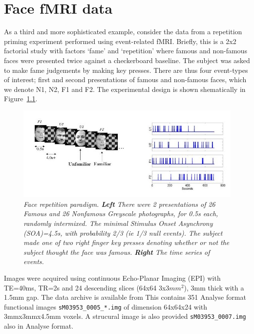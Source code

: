 \documentclass[a4paper,titlepage]{book}
\begin{document}
\chapter{Face fMRI data}

As a third and more sophisticated example, consider the data from a repetition priming experiment performed using event-related fMRI. Briefly, this is a 2x2 factorial study with factors `fame' and `repetition' where famous and non-famous faces were presented twice against a checkerboard baseline. The subject was asked to make fame judgements by making key presses. There are thus four event-types of interest; first and second presentations of famous and non-famous faces, which 
we denote N1, N2, F1 and F2. The experimental design is shown shematically in Figure~\ref{face_design}.
\begin{figure}
\begin{center}
\includegraphics[width=150mm]{face_paradigm}
\caption{\em Face repetition paradigm. {\bf Left} There were 2 presentations of 26 Famous and 26 Nonfamous Greyscale photographs, for 0.5s each, randomly intermixed. The 
minimal Stimulus Onset Asynchrony (SOA)=4.5s, with probability 2/3 (ie 1/3 null events). The subject made one of two 
right finger key presses denoting whether or not the subject thought the face was famous. {\bf Right} The time series of events. \label{face_design}}
\end{center}
\end{figure}


Images were acquired using continuous Echo-Planar 
Imaging (EPI) with TE=40ms, TR=2s and 24 descending slices (64x64 3x3$mm^2$), 3mm thick with a 1.5mm gap.
The data archive is available from 
This contains 351 Analyse format functional images
\verb!sM03953_0005_*.img! of dimension 
64x64x24 with 3mmx3mmx4.5mm voxels. A strucural 
image is also provided \verb!sM03953_0007.img! also in Analyse format.
\end{document}
